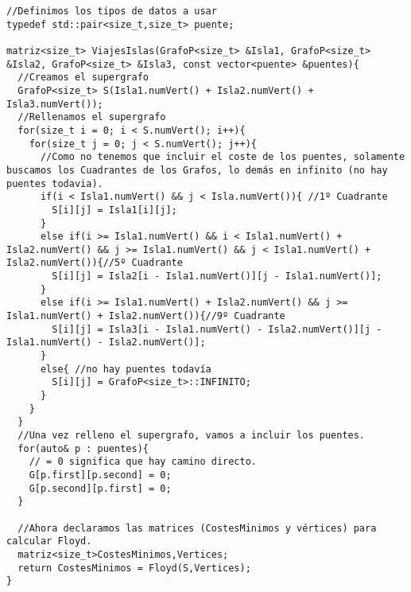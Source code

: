 \begin{verbatim}
//Definimos los tipos de datos a usar
typedef std::pair<size_t,size_t> puente;

matriz<size_t> ViajesIslas(GrafoP<size_t> &Isla1, GrafoP<size_t> &Isla2, GrafoP<size_t> &Isla3, const vector<puente> &puentes){
  //Creamos el supergrafo
  GrafoP<size_t> S(Isla1.numVert() + Isla2.numVert() + Isla3.numVert());
  //Rellenamos el supergrafo
  for(size_t i = 0; i < S.numVert(); i++){
    for(size_t j = 0; j < S.numVert(); j++){
      //Como no tenemos que incluir el coste de los puentes, solamente buscamos los Cuadrantes de los Grafos, lo demás en infinito (no hay puentes todavia).
      if(i < Isla1.numVert() && j < Isla.numVert()){ //1º Cuadrante
        S[i][j] = Isla1[i][j];
      }
      else if(i >= Isla1.numVert() && i < Isla1.numVert() + Isla2.numVert() && j >= Isla1.numVert() && j < Isla1.numVert() + Isla2.numVert()){//5º Cuadrante
        S[i][j] = Isla2[i - Isla1.numVert()][j - Isla1.numVert()];
      }
      else if(i >= Isla1.numVert() + Isla2.numVert() && j >= Isla1.numVert() + Isla2.numVert()){//9º Cuadrante
        S[i][j] = Isla3[i - Isla1.numVert() - Isla2.numVert()][j - Isla1.numVert() - Isla2.numVert()];
      }
      else{ //no hay puentes todavía
        S[i][j] = GrafoP<size_t>::INFINITO;
      }
    }
  }
  //Una vez relleno el supergrafo, vamos a incluir los puentes.
  for(auto& p : puentes){
    // = 0 significa que hay camino directo.
    G[p.first][p.second] = 0;
    G[p.second][p.first] = 0;
  }

  //Ahora declaramos las matrices (CostesMinimos y vértices) para calcular Floyd.
  matriz<size_t>CostesMinimos,Vertices;
  return CostesMinimos = Floyd(S,Vertices);
}
\end{verbatim}

